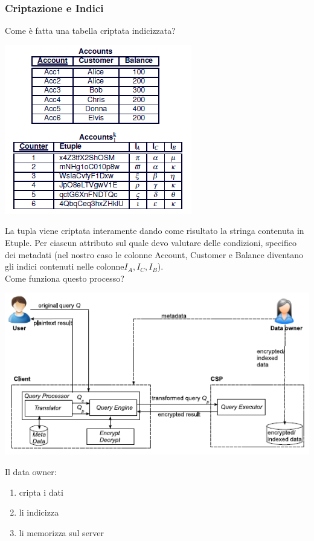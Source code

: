 \subsubsection{Criptazione e Indici}
Come è fatta una tabella criptata indicizzata?
\begin{center}
    \includegraphics[scale=0.6]{img/tabind.png}
\end{center}
La tupla viene criptata interamente dando come risultato la stringa contenuta in Etuple. Per ciascun attributo sul quale devo valutare delle condizioni, specifico dei metadati (nel nostro caso le colonne Account, Customer e Balance diventano gli indici contenuti nelle colonne\(I_A, I_C, I_B\)).\\
Come funziona questo processo?
\begin{center}
    \includegraphics[scale=0.6]{img/queryprocess.png}
\end{center}
Il data owner:
\begin{enumerate}
    \item cripta i dati
    \item li indicizza
    \item li memorizza sul server
\end{enumerate}
